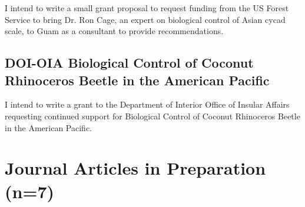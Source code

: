 I intend to write a small grant proposal to request funding from the US Forest Service to bring Dr. Ron Cage, an expert on biological control of Asian cycad scale, to Guam as a consultant to provide recommendations.

\subsection{DOI-OIA Biological Control of Coconut Rhinoceros Beetle in the American Pacific}
\label{doi2}

I intend to write a grant to the Department of Interior Office of Insular Affairs requesting continued support for Biological Control of Coconut Rhinoceros Beetle in the American Pacific.

\pagebreak

\section{Journal Articles in Preparation (n=7)}
\begin{refsection}
	
\nocite{moore_first_nodate-1,moore_mariana_2013,moore_three_nodate-1,moore_change_nodate,moore_aubrey_crb_nodate,marshall_recent_nodate,moore_coconut_nodate-1}

\printbibliography[heading=none]
\end{refsection}


\begin{comment}

\clearpage
\nocite{*}
\printbibliography
\end{comment}


